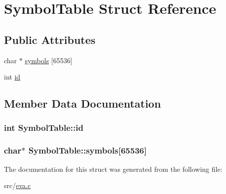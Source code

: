 \hypertarget{struct_symbol_table}{\section{Symbol\-Table Struct Reference}
\label{struct_symbol_table}
}
\subsection*{Public Attributes}
\begin{DoxyCompactItemize}
\item 
char $\ast$ \hyperlink{struct_symbol_table_a77912bffc33b47d6099d7e3dd6af8f27}{symbols} \mbox{[}65536\mbox{]}
\item 
int \hyperlink{struct_symbol_table_a8f38c8bfaedd4b8783462dcee2278a9a}{id}
\end{DoxyCompactItemize}


\subsection{Member Data Documentation}
\hypertarget{struct_symbol_table_a8f38c8bfaedd4b8783462dcee2278a9a}{
\subsubsection[{id}]{\setlength{\rightskip}{0pt plus 5cm}int Symbol\-Table\-::id}}\label{struct_symbol_table_a8f38c8bfaedd4b8783462dcee2278a9a}
\hypertarget{struct_symbol_table_a77912bffc33b47d6099d7e3dd6af8f27}{
\subsubsection[{symbols}]{\setlength{\rightskip}{0pt plus 5cm}char$\ast$ Symbol\-Table\-::symbols\mbox{[}65536\mbox{]}}}\label{struct_symbol_table_a77912bffc33b47d6099d7e3dd6af8f27}


The documentation for this struct was generated from the following file\-:\begin{DoxyCompactItemize}
\item 
src/\hyperlink{eva_8c}{eva.\-c}\end{DoxyCompactItemize}
